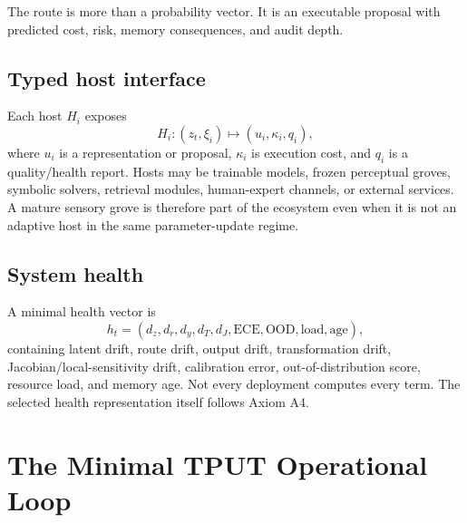 \documentclass[10pt]{article}
\begin{document}
The route is more than a probability vector. It is an executable proposal with predicted cost, risk, memory consequences, and audit depth.

\subsection{Typed host interface}

Each host $H_i$ exposes
\begin{equation}
  H_i: (z_t,\xi_i)\mapsto (u_i,\kappa_i,q_i),
\end{equation}
where $u_i$ is a representation or proposal, $\kappa_i$ is execution cost, and $q_i$ is a quality/health report. Hosts may be trainable models, frozen perceptual groves, symbolic solvers, retrieval modules, human-expert channels, or external services. A mature sensory grove is therefore part of the ecosystem even when it is not an adaptive host in the same parameter-update regime.

\subsection{System health}

A minimal health vector is
\begin{equation}
  h_t=(d_z,d_r,d_y,d_T,d_J,\mathrm{ECE},\mathrm{OOD},\mathrm{load},\mathrm{age}),
  \label{eq:health}
\end{equation}
containing latent drift, route drift, output drift, transformation drift, Jacobian/local-sensitivity drift, calibration error, out-of-distribution score, resource load, and memory age. Not every deployment computes every term. The selected health representation itself follows Axiom A4.

\section{The Minimal TPUT Operational Loop}
\end{document}
